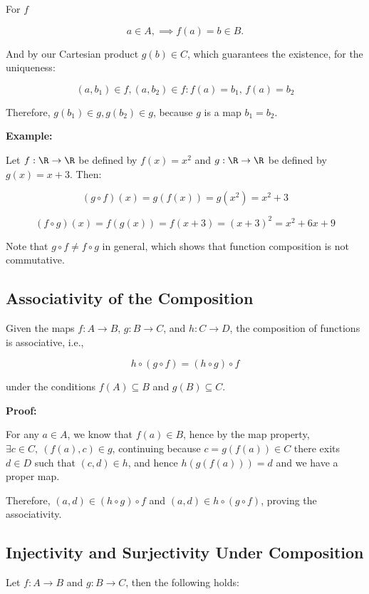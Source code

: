 For \(f\) 

\[
	a \in A, \implies f(a) = b \in B.
\]

And by our Cartesian product \(g(b) \in C\), which guarantees the existence, for the uniqueness: 

\[
	(a, b_1) \in f, (a, b_2) \in f: f(a) = b_1, \, f(a) = b_2
\]

Therefore, \(g(b_1) \in g, g(b_2) \in g\), because \(g\) is a map \(b_1 = b_2\).

\QED

\textbf{Example:}

Let \(f: \R \to \R\) be defined by \(f(x) = x^2\) and \(g: \R \rightarrow \R\) be defined 
by \(g(x) = x+3\). Then:

\[
	(g \circ f)(x) = g(f(x)) = g(x^2) = x^2 + 3
\]

\[
	(f \circ g)(x) = f(g(x)) = f(x+3) = {(x+3)}^2 = x^2 + 6x + 9
\]

Note that \(g \circ f \neq f \circ g\) in general, which shows that function composition is not 
commutative.

\subsection{Associativity of the Composition}

Given the maps \(f: A \to B\), \(g: B \to C\), and \(h: C \to D\), the composition of functions is associative, i.e.,

\[
	h \circ (g \circ f) = (h \circ g) \circ f
\]

under the conditions \(f(A) \subseteq B\) and \(g(B) \subseteq C\).

\textbf{Proof:}

For any \(a \in A\), we know that \(f(a) \in B\), hence by the map property, \(\exists c \in C, \ (f(a), c) \in g\), continuing 
because \(c = g(f(a)) \in C\) there exits \(d \in D\) such that \((c, d) \in h\), and hence \(h(g(f(a))) = d\) and we have a proper map. 

Therefore, \((a, d) \in (h \circ g) \circ f\) and \((a, d) \in h \circ (g \circ f)\), proving the associativity.

\QED

\subsection{Injectivity and Surjectivity Under Composition}

Let \(f: A \to B\) and \(g: B \to C\), then the following holds: 

